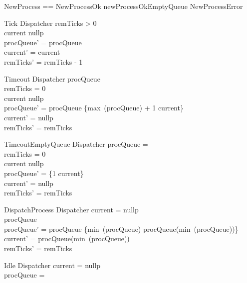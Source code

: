\documentclass{article}
\begin{document}
\begin{zed}
    NewProcess == NewProcessOk \lor newProcessOkEmptyQueue \lor NewProcessError
\end{zed}

\begin{schema}{Tick}
    \Delta Dispatcher
\where
    remTicks > 0 \\
    current \neq nullp \\
    procQueue' = procQueue \\
    current' = current \\
    remTicks' = remTicks - 1    
\end{schema}

\begin{schema}{Timeout}
    \Delta Dispatcher
\where
    procQueue \neq \emptyset \\
    remTicks = 0 \\
    current \neq nullp \\
    procQueue' = procQueue \cup \{max~(\dom procQueue) + 1 \mapsto current\} \\
    current' = nullp \\
    remTicks' = remTicks 
\end{schema}

\begin{schema}{TimeoutEmptyQueue}
    \Delta Dispatcher
\where
    procQueue = \emptyset \\
    remTicks = 0 \\
    current \neq nullp \\
    procQueue' = \{1 \mapsto current\} \\
    current' = nullp \\
    remTicks' = remTicks 
\end{schema}

\begin{schema}{DispatchProcess}
    \Delta Dispatcher
\where
    current = nullp \\
    procQueue \neq \emptyset \\
    procQueue' = procQueue \setminus \{min~(\dom procQueue) \mapsto procQueue(min~(\dom procQueue))\} \\
    current' = procQueue(min~(\dom procQueue)) \\
    remTicks' = remTicks 
\end{schema}

\begin{schema}{Idle}
    \Xi Dispatcher
\where
    current = nullp \\
    procQueue = \emptyset
\end{schema}
\end{document}
